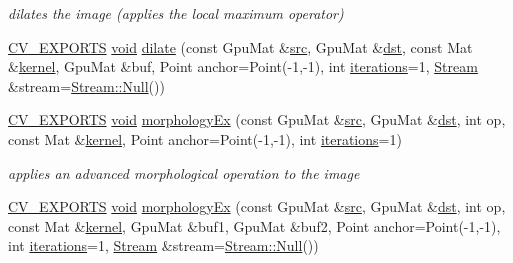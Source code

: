 \begin{DoxyCompactItemize}
\begin{DoxyCompactList}\small\item\em dilates the image (applies the local maximum operator) \end{DoxyCompactList}\item 
\hyperlink{core_2types__c_8h_a1bf9f0e121b54272da02379cfccd0a2b}{C\-V\-\_\-\-E\-X\-P\-O\-R\-T\-S} \hyperlink{legacy_8hpp_a8bb47f092d473522721002c86c13b94e}{void} \hyperlink{namespacecv_1_1gpu_ac5875c98fdf9a6bb51b7cea00e598c9f}{dilate} (const Gpu\-Mat \&\hyperlink{legacy_8hpp_a371cd109b74033bc4366f584edd3dacc}{src}, Gpu\-Mat \&\hyperlink{photo__c_8h_aed13e2a25279b24dc954073233fef7a5}{dst}, const Mat \&\hyperlink{imgproc__c_8h_a863a75780ba6c5de552f5361cb0d2c89}{kernel}, Gpu\-Mat \&buf, Point anchor=Point(-\/1,-\/1), int \hyperlink{tracking_8hpp_a17372ac3c8ba01bc6cfc265b2824992e}{iterations}=1, \hyperlink{classcv_1_1gpu_1_1Stream}{Stream} \&stream=\hyperlink{classcv_1_1gpu_1_1Stream_af96c23564834f88333dcb8997df553f1}{Stream\-::\-Null}())
\item 
\hyperlink{core_2types__c_8h_a1bf9f0e121b54272da02379cfccd0a2b}{C\-V\-\_\-\-E\-X\-P\-O\-R\-T\-S} \hyperlink{legacy_8hpp_a8bb47f092d473522721002c86c13b94e}{void} \hyperlink{namespacecv_1_1gpu_a0e97dc3a449eb0d70b9f832b06e0a0b4}{morphology\-Ex} (const Gpu\-Mat \&\hyperlink{legacy_8hpp_a371cd109b74033bc4366f584edd3dacc}{src}, Gpu\-Mat \&\hyperlink{photo__c_8h_aed13e2a25279b24dc954073233fef7a5}{dst}, int op, const Mat \&\hyperlink{imgproc__c_8h_a863a75780ba6c5de552f5361cb0d2c89}{kernel}, Point anchor=Point(-\/1,-\/1), int \hyperlink{tracking_8hpp_a17372ac3c8ba01bc6cfc265b2824992e}{iterations}=1)
\begin{DoxyCompactList}\small\item\em applies an advanced morphological operation to the image \end{DoxyCompactList}\item 
\hyperlink{core_2types__c_8h_a1bf9f0e121b54272da02379cfccd0a2b}{C\-V\-\_\-\-E\-X\-P\-O\-R\-T\-S} \hyperlink{legacy_8hpp_a8bb47f092d473522721002c86c13b94e}{void} \hyperlink{namespacecv_1_1gpu_a97bb210311e8a8c4d41e466002b3bda2}{morphology\-Ex} (const Gpu\-Mat \&\hyperlink{legacy_8hpp_a371cd109b74033bc4366f584edd3dacc}{src}, Gpu\-Mat \&\hyperlink{photo__c_8h_aed13e2a25279b24dc954073233fef7a5}{dst}, int op, const Mat \&\hyperlink{imgproc__c_8h_a863a75780ba6c5de552f5361cb0d2c89}{kernel}, Gpu\-Mat \&buf1, Gpu\-Mat \&buf2, Point anchor=Point(-\/1,-\/1), int \hyperlink{tracking_8hpp_a17372ac3c8ba01bc6cfc265b2824992e}{iterations}=1, \hyperlink{classcv_1_1gpu_1_1Stream}{Stream} \&stream=\hyperlink{classcv_1_1gpu_1_1Stream_af96c23564834f88333dcb8997df553f1}{Stream\-::\-Null}())

\end{DoxyCompactItemize}
